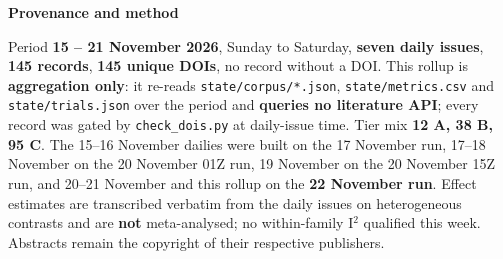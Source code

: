 \documentclass[10pt]{article}
\begin{document}
\vspace{4mm}
\begin{keybox}
{\sffamily\bfseries\footnotesize\color{Deep}Provenance and method}\\[1.2mm]
{\fontsize{7.2}{8.8}\selectfont
Period \textbf{15 -- 21 November 2026}, Sunday to Saturday, \textbf{seven daily issues},
\textbf{145 records}, \textbf{145 unique DOIs}, no record without a DOI. This rollup is
\textbf{aggregation only}: it re-reads \texttt{state/corpus/*.json}, \texttt{state/metrics.csv} and
\texttt{state/trials.json} over the period and \textbf{queries no literature API}; every record was gated by
\texttt{check\_dois.py} at daily-issue time. Tier mix \textbf{12 A, 38 B, 95 C}. The 15--16 November dailies were
built on the 17 November run, 17--18 November on the 20 November 01Z run, 19 November on the 20 November 15Z run,
and 20--21 November and this rollup on the \textbf{22 November run}. Effect estimates are transcribed verbatim from
the daily issues on heterogeneous contrasts and are \textbf{not} meta-analysed; no within-family I$^2$ qualified this
week. Abstracts remain the copyright of their respective publishers.\par}
\end{keybox}
\end{document}
